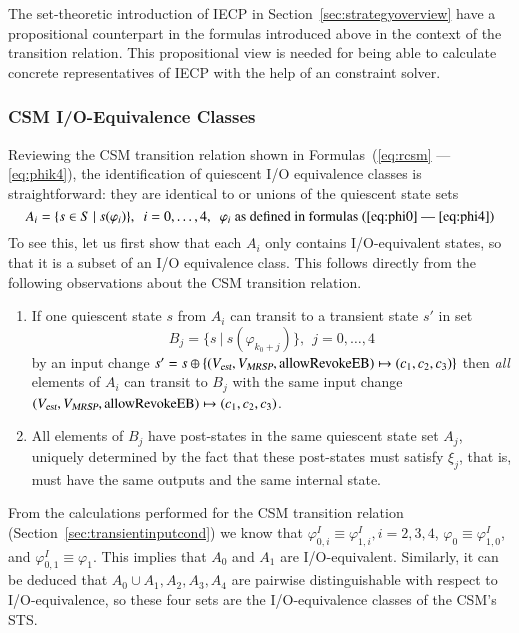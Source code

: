 
The set-theoretic introduction of IECP in Section~\ref{sec:strategyoverview} 
have a propositional counterpart in the formulas introduced above in the context of the transition relation. This propositional view is needed for  being able to calculate concrete representatives of IECP with the help of an constraint solver.

\subsubsection{CSM I/O-Equivalence Classes}\label{sec:csmioeq}
  
Reviewing the CSM transition relation shown in Formulas~(\ref{eq:rcsm} --- \ref{eq:phik4}),
the identification of quiescent I/O equivalence classes is straightforward: they are identical to or unions of the quiescent state sets
\begin{equation}
\label{eq:aicsm}
A_i = \{ s\in S~|~s(\varphi_i)  \},\ \ i = 0,\dots,4,\ \ \text{$\varphi_i$ as defined in formulas~(\ref{eq:phi0} --- \ref{eq:phi4})}
\end{equation}
To see this, let us first show that each $A_i$ only contains I/O-equivalent states, so that it is a subset of an I/O equivalence class.  This follows directly from the following observations about the CSM transition relation.
\begin{enumerate}
\item If one quiescent state $s$ from $A_i$ can transit to a transient state $s'$ in set
$$
B_j = \{s~|~s(\varphi_{k_0+j})\},\ \ j = 0,\dots,4
$$
by an input change $s' = s\oplus\{({V_{\text{\sl est}}},{V_{\text{\sl MRSP}}},\text{allowRevokeEB}) \mapsto (c_1,c_2,c_3)\}$
then {\it all} elements of $A_i$ can transit to $B_j$ with the same input change $({V_{\text{\sl est}}},{V_{\text{\sl MRSP}}},\text{allowRevokeEB}) \mapsto (c_1,c_2,c_3)$.

\item All elements of $B_j$ have post-states in the same quiescent state set $A_j$, uniquely determined by the fact that these post-states   must satisfy $\xi_j$, that is, must have the same outputs and the same internal state.
\end{enumerate}

From the calculations performed for the CSM transition relation (Section~\ref{sec:transientinputcond}) we know that $\varphi_{0,i}^I \equiv \varphi_{1,i}^I, i = 2,3,4$,  
$\varphi_0\equiv \varphi_{1,0}^I$, and $\varphi_{0,1}^I \equiv \varphi_1$. This implies that $A_0$ and $A_1$ are I/O-equivalent. Similarly, it can be deduced that $A_0\cup A_1,A_2, A_3, A_4$ are 
pairwise distinguishable with respect to I/O-equivalence, so these four sets are the I/O-equivalence classes of the CSM's STS.


